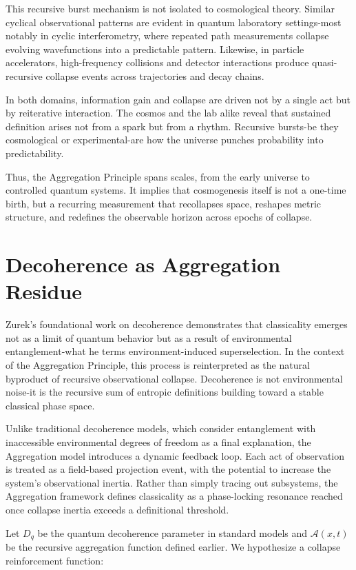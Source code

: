 This recursive burst mechanism is not isolated to cosmological theory. Similar cyclical observational patterns are evident in quantum laboratory settings-most notably in cyclic interferometry, where repeated path measurements collapse evolving wavefunctions into a predictable pattern. Likewise, in particle accelerators, high-frequency collisions and detector interactions produce quasi-recursive collapse events across trajectories and decay chains.

In both domains, information gain and collapse are driven not by a single act but by reiterative interaction. The cosmos and the lab alike reveal that sustained definition arises not from a spark but from a rhythm. Recursive bursts-be they cosmological or experimental-are how the universe punches probability into predictability.

Thus, the Aggregation Principle spans scales, from the early universe to controlled quantum systems. It implies that cosmogenesis itself is not a one-time birth, but a recurring measurement that recollapses space, reshapes metric structure, and redefines the observable horizon across epochs of collapse.

\section{Decoherence as Aggregation Residue}

Zurek's foundational work on decoherence \cite{aggregation_decoherence_core} demonstrates that classicality emerges not as a limit of quantum behavior but as a result of environmental entanglement-what he terms environment-induced superselection. In the context of the Aggregation Principle, this process is reinterpreted as the natural byproduct of recursive observational collapse. Decoherence is not environmental noise-it is the recursive sum of entropic definitions building toward a stable classical phase space.

Unlike traditional decoherence models, which consider entanglement with inaccessible environmental degrees of freedom as a final explanation, the Aggregation model introduces a dynamic feedback loop. Each act of observation is treated as a field-based projection event, with the potential to increase the system’s observational inertia. Rather than simply tracing out subsystems, the Aggregation framework defines classicality as a phase-locking resonance reached once collapse inertia exceeds a definitional threshold.

Let \( D_q \) be the quantum decoherence parameter in standard models and \( \mathcal{A}(x,t) \) be the recursive aggregation function defined earlier. We hypothesize a collapse reinforcement function:

